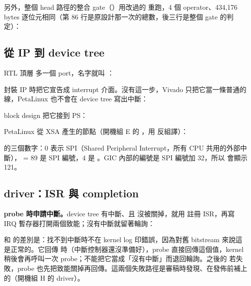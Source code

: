 
另外，整個 head 路徑的整合 gate（）用改過的  重跑，4 個 operator、434,176 bytes 逐位元相同（第 86 行是原設計那一次的總數，後三行是整個 gate 的判定）：


\subsection{從 IP 到 device tree}

RTL 頂層  多一個 port，名字就叫 ：


封裝 IP 時把它宣告成 interrupt 介面。沒有這一步，Vivado 只把它當一條普通的線，PetaLinux 也不會在 device tree 寫出中斷：


block design 把它接到 PS：


PetaLinux 從 XSA 產生的節點（開機組 E 的 ，用  反組譯）：


 的三個數字：0 表示 SPI（Shared Peripheral Interrupt，所有 CPU 共用的外部中斷）， = 89 是 SPI 編號，4 是 。GIC 內部的編號是 SPI 編號加 32，所以  會顯示 121。

\subsection{driver：ISR 與 completion}

\textbf{probe 時申請中斷。}device tree 有中斷、且  沒被關掉，就用  註冊 ISR，再寫 IRQ 暫存器打開兩個致能；沒有中斷就留著輪詢：


 和  的差別是：找不到中斷時不在 kernel log 印錯誤，因為對舊 bitstream 來說這是正常的。它回傳  時（中斷控制器還沒準備好），probe 直接回傳這個值，kernel 稍後會再呼叫一次 probe；不能把它當成「沒有中斷」而退回輪詢。之後的  若失敗，probe 也先把致能關掉再回傳。這兩個失敗路徑是審稿時發現、在發佈前補上的（開機組 H 的 driver）。

